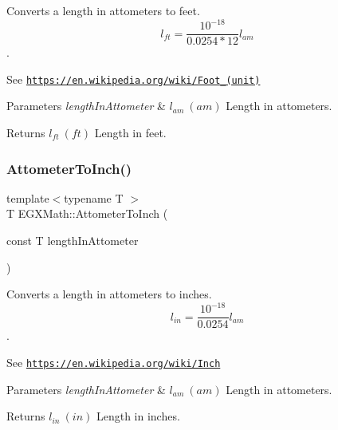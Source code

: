 Converts a length in attometers to feet. \[ l_{ft}= \frac{10^{-18}}{0.0254 * 12} l_{am} \]. 

See \href{https://en.wikipedia.org/wiki/Foot_(unit)}{\tt https\+://en.\+wikipedia.\+org/wiki/\+Foot\+\_\+(unit)} 
\begin{DoxyParams}{Parameters}
{\em length\+In\+Attometer} & $ l_{am}\ (am)$ Length in attometers. \\
\hline
\end{DoxyParams}
\begin{DoxyReturn}{Returns}
$ l_{ft}\ (ft)$ Length in feet. 
\end{DoxyReturn}
\mbox{\label{group___e_g_x_math-_conversions-_length_conversions-_attometer-_imperial_ga76cb652df52a89284cc3661a670d4990}} 
\subsubsection{\texorpdfstring{Attometer\+To\+Inch()}{AttometerToInch()}}
{\footnotesize\ttfamily template$<$typename T $>$ \\
T E\+G\+X\+Math\+::\+Attometer\+To\+Inch (\begin{DoxyParamCaption}\item[{const T}]{length\+In\+Attometer }\end{DoxyParamCaption})}



Converts a length in attometers to inches. \[ l_{in}= \frac{10^{-18}}{0.0254} l_{am} \]. 

See \href{https://en.wikipedia.org/wiki/Inch}{\tt https\+://en.\+wikipedia.\+org/wiki/\+Inch} 
\begin{DoxyParams}{Parameters}
{\em length\+In\+Attometer} & $ l_{am}\ (am)$ Length in attometers. \\
\hline
\end{DoxyParams}
\begin{DoxyReturn}{Returns}
$ l_{in}\ (in)$ Length in inches. 
\end{DoxyReturn}
\mbox{\label{group___e_g_x_math-_conversions-_length_conversions-_attometer-_imperial_ga1ad78989a93e5316f787a6412e2c8e3a}} 
